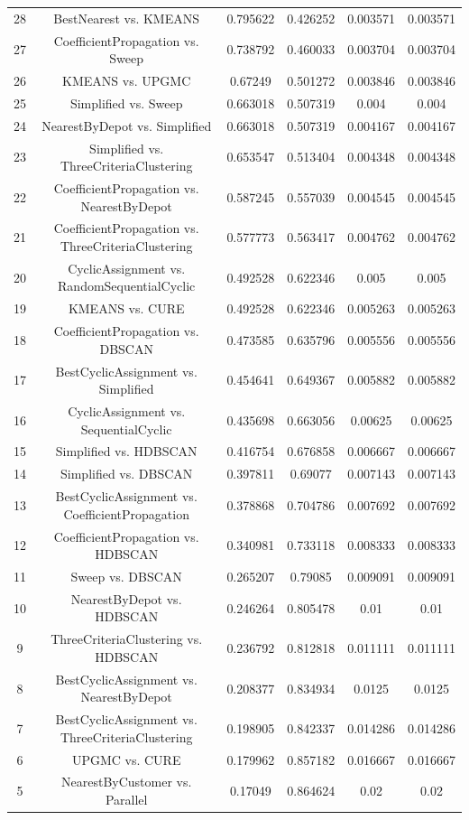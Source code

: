 \documentclass[a4paper,10pt]{article}
\begin{document}
\begin{landscape}
\begin{table}[!htp]
\begin{tabular}{cccccc}
28&BestNearest vs. KMEANS&0.795622&0.426252&0.003571&0.003571\\
27&CoefficientPropagation vs. Sweep&0.738792&0.460033&0.003704&0.003704\\
26&KMEANS vs. UPGMC&0.67249&0.501272&0.003846&0.003846\\
25&Simplified vs. Sweep&0.663018&0.507319&0.004&0.004\\
24&NearestByDepot vs. Simplified&0.663018&0.507319&0.004167&0.004167\\
23&Simplified vs. ThreeCriteriaClustering&0.653547&0.513404&0.004348&0.004348\\
22&CoefficientPropagation vs. NearestByDepot&0.587245&0.557039&0.004545&0.004545\\
21&CoefficientPropagation vs. ThreeCriteriaClustering&0.577773&0.563417&0.004762&0.004762\\
20&CyclicAssignment vs. RandomSequentialCyclic&0.492528&0.622346&0.005&0.005\\
19&KMEANS vs. CURE&0.492528&0.622346&0.005263&0.005263\\
18&CoefficientPropagation vs. DBSCAN&0.473585&0.635796&0.005556&0.005556\\
17&BestCyclicAssignment vs. Simplified&0.454641&0.649367&0.005882&0.005882\\
16&CyclicAssignment vs. SequentialCyclic&0.435698&0.663056&0.00625&0.00625\\
15&Simplified vs. HDBSCAN&0.416754&0.676858&0.006667&0.006667\\
14&Simplified vs. DBSCAN&0.397811&0.69077&0.007143&0.007143\\
13&BestCyclicAssignment vs. CoefficientPropagation&0.378868&0.704786&0.007692&0.007692\\
12&CoefficientPropagation vs. HDBSCAN&0.340981&0.733118&0.008333&0.008333\\
11&Sweep vs. DBSCAN&0.265207&0.79085&0.009091&0.009091\\
10&NearestByDepot vs. HDBSCAN&0.246264&0.805478&0.01&0.01\\
9&ThreeCriteriaClustering vs. HDBSCAN&0.236792&0.812818&0.011111&0.011111\\
8&BestCyclicAssignment vs. NearestByDepot&0.208377&0.834934&0.0125&0.0125\\
7&BestCyclicAssignment vs. ThreeCriteriaClustering&0.198905&0.842337&0.014286&0.014286\\
6&UPGMC vs. CURE&0.179962&0.857182&0.016667&0.016667\\
5&NearestByCustomer vs. Parallel&0.17049&0.864624&0.02&0.02\\

\end{tabular}
\end{table}
\end{landscape}
\end{document}
